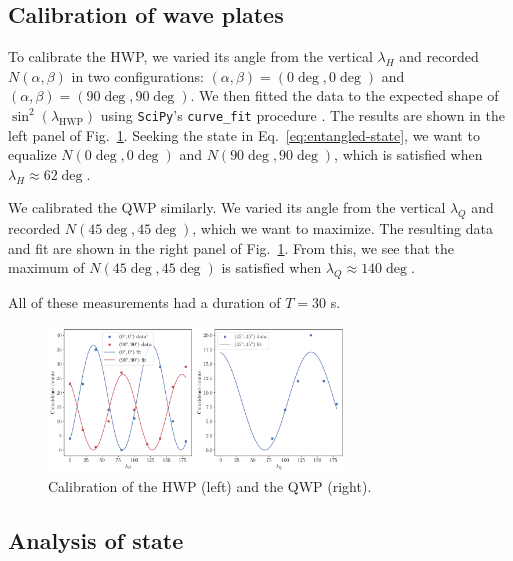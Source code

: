 \documentclass{../paper}
\newcommand{\eq}[1]{Eq.~\eqref{#1}}
\newcommand{\fig}[1]{Fig.~\ref{#1}}
\begin{document}
\subsection{Calibration of wave plates}

To calibrate the HWP, we varied its angle from the vertical $\lambda_H$ and recorded $N(\alpha, \beta)$ in two configurations: $(\alpha,\beta) = (0\deg, 0\deg)$ and $(\alpha,\beta) = (90\deg, 90\deg)$. We then fitted the data to the expected shape of $\sin^2(\lambda_\text{HWP})$ using {\tt SciPy}'s {\tt curve\_fit} procedure \cite{SciPy}. The results are shown in the left panel of \fig{fig:wave-plates}. Seeking the state in \eq{eq:entangled-state}, we want to equalize $N(0\deg,0\deg)$ and $N(90\deg,90\deg)$, which is satisfied when $\lambda_H \approx 62\deg$.

We calibrated the QWP similarly. We varied its angle from the vertical $\lambda_Q$ and recorded $N(45\deg,45\deg)$, which we want to maximize. The resulting data and fit are shown in the right panel of \fig{fig:wave-plates}. From this, we see that the maximum of $N(45\deg,45\deg)$ is satisfied when $\lambda_Q \approx 140\deg$.

All of these measurements had a duration of $T = 30$ s.

\begin{figure}
  \centering
  \includegraphics[width=0.7\textwidth]{analysis/wave-plates.pdf}
  \caption{Calibration of the HWP (left) and the QWP (right).}
  \label{fig:wave-plates}
\end{figure}

\subsection{Analysis of state}
\end{document}

